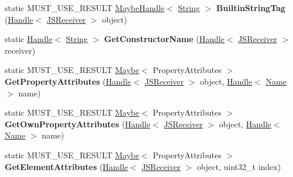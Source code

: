 \begin{DoxyCompactItemize}
\item 
static M\+U\+S\+T\+\_\+\+U\+S\+E\+\_\+\+R\+E\+S\+U\+LT \hyperlink{classv8_1_1internal_1_1_maybe_handle}{Maybe\+Handle}$<$ \hyperlink{classv8_1_1internal_1_1_string}{String} $>$ {\bfseries Builtin\+String\+Tag} (\hyperlink{classv8_1_1internal_1_1_handle}{Handle}$<$ \hyperlink{classv8_1_1internal_1_1_j_s_receiver}{J\+S\+Receiver} $>$ object)\hypertarget{classv8_1_1internal_1_1_j_s_receiver_af7d4bdc282105130e13dd7a4bb0c79bd}{}\label{classv8_1_1internal_1_1_j_s_receiver_af7d4bdc282105130e13dd7a4bb0c79bd}

\item 
static \hyperlink{classv8_1_1internal_1_1_handle}{Handle}$<$ \hyperlink{classv8_1_1internal_1_1_string}{String} $>$ {\bfseries Get\+Constructor\+Name} (\hyperlink{classv8_1_1internal_1_1_handle}{Handle}$<$ \hyperlink{classv8_1_1internal_1_1_j_s_receiver}{J\+S\+Receiver} $>$ receiver)\hypertarget{classv8_1_1internal_1_1_j_s_receiver_af58a0845cf3cea09014c7f0abe24edfa}{}\label{classv8_1_1internal_1_1_j_s_receiver_af58a0845cf3cea09014c7f0abe24edfa}

\item 
static M\+U\+S\+T\+\_\+\+U\+S\+E\+\_\+\+R\+E\+S\+U\+LT \hyperlink{classv8_1_1_maybe}{Maybe}$<$ Property\+Attributes $>$ {\bfseries Get\+Property\+Attributes} (\hyperlink{classv8_1_1internal_1_1_handle}{Handle}$<$ \hyperlink{classv8_1_1internal_1_1_j_s_receiver}{J\+S\+Receiver} $>$ object, \hyperlink{classv8_1_1internal_1_1_handle}{Handle}$<$ \hyperlink{classv8_1_1internal_1_1_name}{Name} $>$ name)\hypertarget{classv8_1_1internal_1_1_j_s_receiver_a7b9892f62580064e9a749bc82cc20f50}{}\label{classv8_1_1internal_1_1_j_s_receiver_a7b9892f62580064e9a749bc82cc20f50}

\item 
static M\+U\+S\+T\+\_\+\+U\+S\+E\+\_\+\+R\+E\+S\+U\+LT \hyperlink{classv8_1_1_maybe}{Maybe}$<$ Property\+Attributes $>$ {\bfseries Get\+Own\+Property\+Attributes} (\hyperlink{classv8_1_1internal_1_1_handle}{Handle}$<$ \hyperlink{classv8_1_1internal_1_1_j_s_receiver}{J\+S\+Receiver} $>$ object, \hyperlink{classv8_1_1internal_1_1_handle}{Handle}$<$ \hyperlink{classv8_1_1internal_1_1_name}{Name} $>$ name)\hypertarget{classv8_1_1internal_1_1_j_s_receiver_a8a04e35c5c52be5c915a6fa942c3dfa7}{}\label{classv8_1_1internal_1_1_j_s_receiver_a8a04e35c5c52be5c915a6fa942c3dfa7}

\item 
static M\+U\+S\+T\+\_\+\+U\+S\+E\+\_\+\+R\+E\+S\+U\+LT \hyperlink{classv8_1_1_maybe}{Maybe}$<$ Property\+Attributes $>$ {\bfseries Get\+Element\+Attributes} (\hyperlink{classv8_1_1internal_1_1_handle}{Handle}$<$ \hyperlink{classv8_1_1internal_1_1_j_s_receiver}{J\+S\+Receiver} $>$ object, uint32\+\_\+t index)\hypertarget{classv8_1_1internal_1_1_j_s_receiver_a0f6747e250489f729d45db1643bb077e}{}\label{classv8_1_1internal_1_1_j_s_receiver_a0f6747e250489f729d45db1643bb077e}


\end{DoxyCompactItemize}
